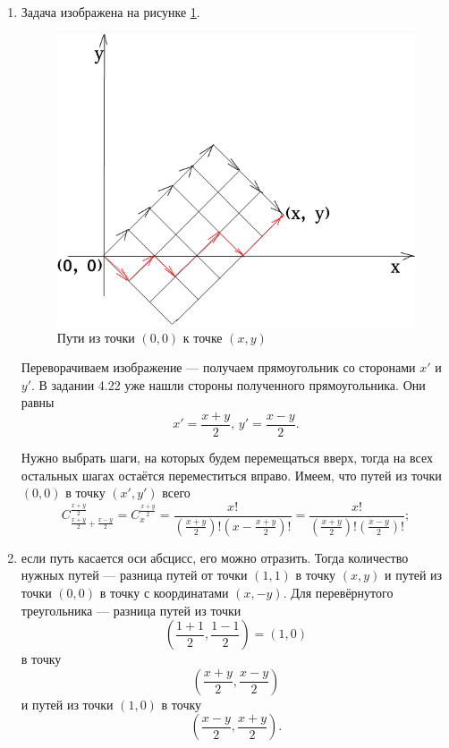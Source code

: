 \begin{enumerate}[label=\alph*)]
\item Задача изображена на рисунке \ref{fig:411}.

\begin{figure}[h!]
  \centering
  \includegraphics[width=.7\textwidth]{./pictures/4_11.png}
  \caption{Пути из точки $ \left( 0, 0 \right) $ к точке $ \left( x, y \right) $}
  \label{fig:411}
\end{figure}

Переворачиваем изображение --- получаем прямоугольник со сторонами $x'$ и $y'$.
В задании 4.22 уже нашли стороны полученного прямоугольника.
Они равны
$$x' = \frac{x+y}{2}, \, y' = \frac{x-y}{2}.$$

Нужно выбрать шаги, на которых будем перемещаться вверх, тогда на всех остальных шагах остаётся переместиться вправо.
Имеем, что путей из точки $ \left( 0, 0 \right) $ в точку $ \left( x', y' \right) $ всего
$$C_{ \frac{x+y}{2} + \frac{x-y}{2} }^{ \frac{x+y}{2} } =
C_{x}^{ \frac{x+y}{2} } =
\frac{x!}{ \left( \frac{x+y}{2} \right)! \left( x - \frac{x+y}{2} \right)!} =
\frac{x!}{ \left( \frac{x+y}{2} \right)! \left( \frac{x-y}{2} \right)!};$$

\item если путь касается оси абсцисс, его можно отразить.
Тогда количество нужных путей --- разница путей от точки $ \left( 1, 1 \right) $ в точку $ \left( x, y \right) $ и путей из точки $ \left( 0, 0 \right) $ в точку с координатами $ \left( x, -y \right) $.
Для перевёрнутого треугольника --- разница путей из точки
$$ \left( \frac{1+1}{2}, \frac{1-1}{2} \right) =
\left( 1, 0 \right) $$
в точку
$$ \left( \frac{x+y}{2}, \frac{x-y}{2} \right) $$
и путей из точки $ \left( 1, 0 \right) $ в точку
$$ \left( \frac{x-y}{2}, \frac{x+y}{2} \right).$$


\end{enumerate}
